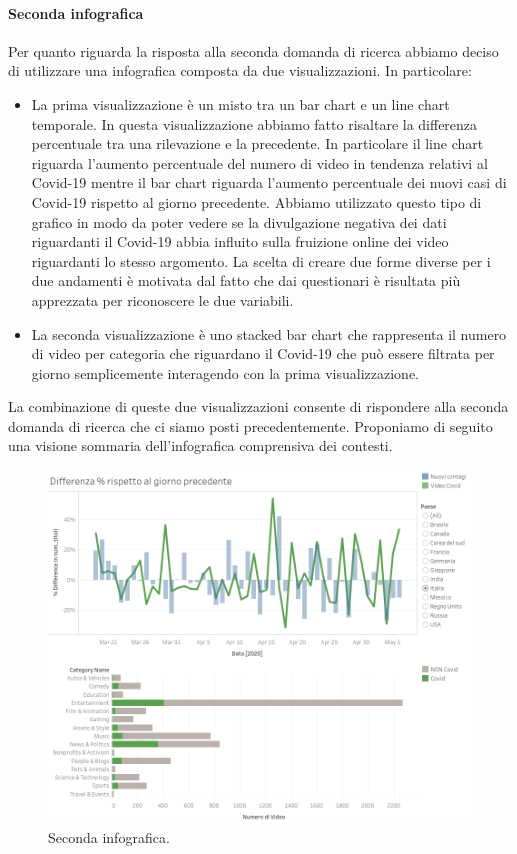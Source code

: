 \documentclass[10pt, a4paper,openany]{article}
\begin{document}
\paragraph{Seconda infografica} Per quanto riguarda la risposta alla seconda domanda di ricerca abbiamo deciso di utilizzare una infografica composta da due visualizzazioni. In particolare:
\begin{itemize}
	\item La prima visualizzazione è un misto tra un bar chart e un line chart temporale. In questa visualizzazione abbiamo fatto risaltare la differenza percentuale tra una rilevazione e la precedente. In particolare il line chart riguarda l'aumento percentuale del numero di video in tendenza relativi al Covid-19 mentre il bar chart riguarda l'aumento percentuale dei nuovi casi di Covid-19 rispetto al giorno precedente. Abbiamo utilizzato questo tipo di grafico in modo da poter vedere se la divulgazione negativa dei dati riguardanti il Covid-19 abbia influito sulla fruizione online dei video riguardanti lo stesso argomento. La scelta di creare due forme diverse per i due andamenti è motivata dal fatto che dai questionari è risultata più apprezzata per riconoscere le due variabili.
	\item La seconda visualizzazione è uno stacked bar chart che rappresenta il numero di video per categoria che riguardano il Covid-19 che può essere filtrata per giorno semplicemente interagendo con la prima visualizzazione.
\end{itemize}

La combinazione di queste due visualizzazioni consente di rispondere alla seconda domanda di ricerca che ci siamo posti precedentemente. Proponiamo di seguito una visione sommaria dell'infografica comprensiva dei contesti.

\begin{figure}[H]
	\centering
	\includegraphics[height=0.5 \linewidth]{pics/seconda_infografica.png}
	\caption{Seconda infografica.}
\end{figure}
\end{document}
